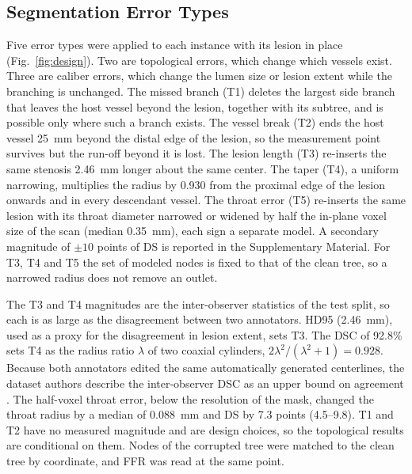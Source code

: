 \documentclass[journal,twoside,web]{ieeecolor}
\begin{document}
\subsection{Segmentation Error Types}
Five error types were applied to each instance with its lesion in place (Fig.~\ref{fig:design}). Two are
topological errors, which change which vessels exist. Three are caliber errors, which change the lumen size or lesion
extent while the branching is unchanged. The missed branch (T1) deletes the largest side branch that leaves the host
vessel beyond the lesion, together with its subtree, and is possible only where such a branch exists. The vessel break (T2) ends the host vessel 25~mm beyond the
distal edge of the lesion, so the measurement point survives but the run-off beyond it is lost. The lesion length
(T3) re-inserts the same stenosis 2.46~mm longer about the same center. The taper (T4), a uniform narrowing, multiplies the radius by 0.930 from the proximal
edge of the lesion onwards and in every descendant vessel. The throat error (T5) re-inserts the same lesion with its throat diameter narrowed or widened by half the in-plane voxel size of the scan (median 0.35~mm), each sign a separate model. A secondary magnitude of $\pm 10$ points of DS is reported in the Supplementary Material. For T3, T4 and T5 the set of modeled nodes is fixed to that
of the clean tree, so a narrowed radius does not remove an outlet.

The T3 and T4 magnitudes are the inter-observer statistics of the test split, so each is as large as
the disagreement between two annotators. HD95 (2.46~mm), used as a proxy for the disagreement in lesion extent, sets T3. The DSC of 92.8\% sets T4 as the radius
ratio $\lambda$ of two coaxial cylinders, $2\lambda^2/(\lambda^2+1) = 0.928$. Because both annotators edited the same automatically
generated centerlines, the dataset authors describe the inter-observer DSC as an upper bound on agreement \cite{bransby2026}. The half-voxel
throat error, below the resolution of the mask, changed the throat radius by a median of 0.088~mm and DS by 7.3 points (4.5--9.8). T1 and T2 have
no measured magnitude and are design choices, so the topological results are conditional on them. Nodes of the corrupted tree were matched to the clean tree by
coordinate, and FFR was read at the same point.
\end{document}
